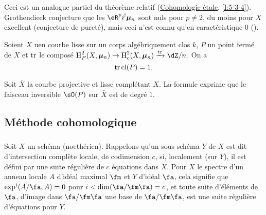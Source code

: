 Ceci est un analogue partiel du théorème relatif 
(\hyperref[I]{Cohomologie étale}, \ref{I:5-3-4}). Grothendieck conjecture 
que les $\eR^p i^! \dmu_n$ sont nuls pour $p\ne 2$, du moins pour $X$ excellent 
(conjecture de pureté), mais ceci n'est connu qu'en caractéristique $0$ 
(\cite[XIX]{sga4}). 




\begin{theorem}\label{IV:2-1-5}
Soient $X$ uen courbe lisse sur un corps algébriquement clos $k$, $P$ un 
point fermé de $X$ et $\operatorname{tr}$ le composé $\h_P^2(X,\dmu_n) \to \h_c^2(X,\dmu_n) \xrightarrow{\tr} \dZ/n$. On a 
\[
  \operatorname{tr} \operatorname{cl}(P) = 1 \text{.}
\]
\end{theorem}

Soit $\bar X$ la courbe projective et lisse complétant $X$. La formule 
exprime que le faisceau inversible $\sO(P)$ sur $\bar X$ est de degré $1$. 










\subsection{Méthode cohomologique}\label{IV:2-2}





\subsubsection{}\label{IV:2-2-1}

Soit $X$ un schéma (noethérien). Rappelons qu'un sous-schéma $Y$ de $X$ 
est dit d'intersection complète locale, de codimension $c$, si, localement 
(sur $Y$), il est défini par une suite régulière de $c$ équations dans 
$X$. Pour $X$ le spectre d'un anneau locale $A$ d'idéal maximal $\fm$ et 
$Y$ d'idéal $\fa$, cela signifie que $\exp^i(A/\fa,A) = 0$ pour 
$i<\dim(\fa/\fm\fa)=c$, et toute suite d'éléments de $\fa$, d'image dans 
$\fa/\fm\fa$ une base de $\fa/\fm\fa$, est une suite régulière 
d'équations pour $Y$. 





\subsubsection{}\label{IV:2-2-2}

